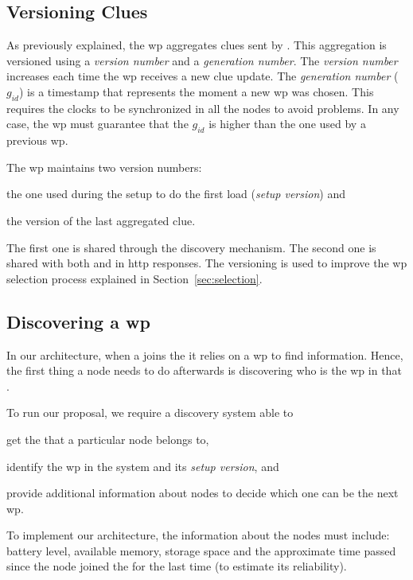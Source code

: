 \subsection{Versioning Clues}
As previously explained, the \ac{wp} aggregates clues sent by \providers{}.
This aggregation is versioned using a \emph{version number} and a \emph{generation number}.
The \emph{version number} increases each time the \ac{wp} receives a new clue update.
The \emph{generation number} ($g_{id}$) is a timestamp that represents the moment a new \ac{wp} was chosen.
This requires the clocks to be synchronized in all the nodes to avoid problems.
In any case, the \ac{wp} must guarantee that the $g_{id}$ is higher than the one used by a previous \ac{wp}.

The \ac{wp} maintains two version numbers:
\begin{enumerate*}[label=\itshape(\arabic*\upshape)]
  \item the one used during the setup to do the first load (\emph{setup version}) and
  \item the version of the last aggregated clue.
\end{enumerate*}
The first one is shared through the discovery mechanism.
The second one is shared with both \providers{} and \consumers{} in \acs{http} responses.
The versioning is used to improve the \ac{wp} selection process explained in Section~\ref{sec:selection}.


\subsection{Discovering a \acl{wp}}
In our architecture, when a \consumer{} joins the \Space{} it relies on a \ac{wp} to find information.
Hence, the first thing a node needs to do afterwards is discovering who is the \ac{wp} in that \Space{}.

To run our proposal, we require a discovery system able to
\begin{enumerate*}[label=\itshape(\arabic*\upshape)]
  \item get the \Spaces{} that a particular node belongs to,
  \item identify the \ac{wp} in the system and its \emph{setup version}, and
  \item provide additional information about nodes to decide which one can be the next \ac{wp}.
\end{enumerate*}
To implement our architecture, the information about the nodes must include:
battery level, available memory, storage space and the approximate time passed since the node joined the \Space{} for the last time (to estimate its reliability).

